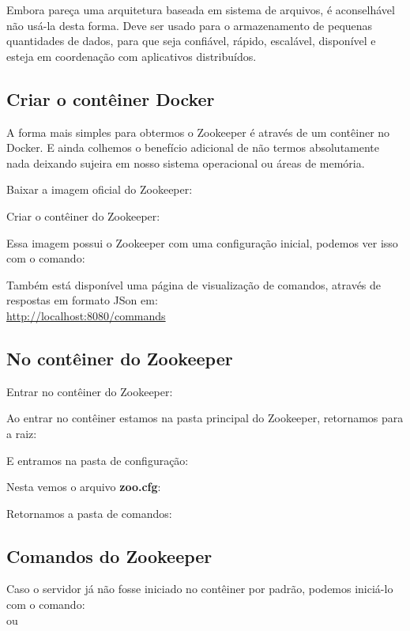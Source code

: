 \documentclass[a4paper,11pt]{article}
\begin{document}
Embora pareça uma arquitetura baseada em sistema de arquivos, é aconselhável não usá-la desta forma. Deve ser usado para o armazenamento de pequenas quantidades de dados, para que seja confiável, rápido, escalável, disponível e esteja em coordenação com aplicativos distribuídos.

\subsection{Criar o contêiner Docker}
A forma mais simples para obtermos o Zookeeper é através de um contêiner no Docker. E ainda colhemos o benefício adicional de não termos absolutamente nada deixando sujeira em nosso sistema operacional ou áreas de memória.

Baixar a imagem oficial do Zookeeper: \\

Criar o contêiner do Zookeeper: \\

Essa imagem possui o Zookeeper com uma configuração inicial, podemos ver isso com o comando: \\

Também está disponível uma página de visualização de comandos, através de respostas em formato JSon em: \\
\url{http://localhost:8080/commands}

\subsection{No contêiner do Zookeeper}
Entrar no contêiner do Zookeeper: \\

Ao entrar no contêiner estamos na pasta principal do Zookeeper, retornamos para a raiz: \\

E entramos na pasta de configuração: \\

Nesta vemos o arquivo \textbf{zoo.cfg}: \\

Retornamos a pasta de comandos: \\

\subsection{Comandos do Zookeeper}
Caso o servidor já não fosse iniciado no contêiner por padrão, podemos iniciá-lo com o comando: \\
 ou \\
\end{document}
